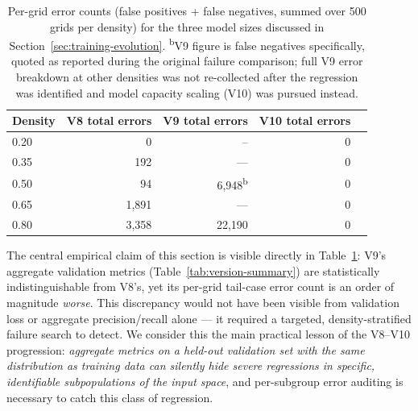 \begin{table}[htbp]
\centering
\begin{tabular}{lrrrr}
\toprule
Density & V8 total errors & V9 total errors & V10 total errors \\
\midrule
0.20 & 0     & --   & 0 \\
0.35 & 192   & ---  & 0 \\
0.50 & 94    & 6{,}948\textsuperscript{b} & 0 \\
0.65 & 1{,}891 & ---  & 0 \\
0.80 & 3{,}358 & 22{,}190 & 0 \\
\bottomrule
\end{tabular}
\caption{Per-grid error counts (false positives + false negatives, summed
over 500 grids per density) for the three model sizes discussed in
Section~\ref{sec:training-evolution}. \textsuperscript{b}V9 figure is false
negatives specifically, quoted as reported during the original failure
comparison; full V9 error breakdown at other densities was not re-collected
after the regression was identified and model capacity scaling (V10) was
pursued instead.}
\label{tab:per-grid-errors}
\end{table}

The central empirical claim of this section is visible directly in
Table~\ref{tab:per-grid-errors}: V9's aggregate validation metrics
(Table~\ref{tab:version-summary}) are statistically indistinguishable from
V8's, yet its per-grid tail-case error count is an order of magnitude
\emph{worse}. This discrepancy would not have been visible from validation
loss or aggregate precision/recall alone --- it required a targeted,
density-stratified failure search to detect. We consider this the main
practical lesson of the V8--V10 progression: \emph{aggregate metrics on a
held-out validation set with the same distribution as training data can
silently hide severe regressions in specific, identifiable subpopulations
of the input space}, and per-subgroup error auditing is necessary to catch
this class of regression.
